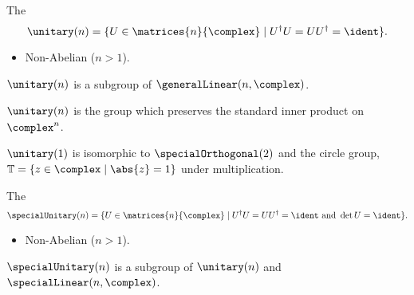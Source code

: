 \begin{dfn}{}{}
    The 
    \begin{equation}
        \unitary(n) = \{ U \in \matrices{n}{\complex} \mid U^\hermit U = UU^\hermit = \ident \}.
    \end{equation}
    
    \begin{multicols}{2}
        \begin{itemize}
            \item Non-Abelian (\(n > 1\)).
        \end{itemize}
    \end{multicols}
    
    \(\unitary(n)\) is a subgroup of \(\generalLinear(n, \complex)\).
    
    \(\unitary(n)\) is the group which preserves the standard inner product on \(\complex^n\).
    
    \(\unitary(1)\) is isomorphic to \(\specialOrthogonal(2)\) and the circle group, \(\mathbb{T} = \{z \in \complex \mid \abs{z} = 1\}\) under multiplication.
\end{dfn}

\begin{dfn}{}{}
    The 
    \begin{equation}
        \specialUnitary(n) = \{ U \in \matrices{n}{\complex} \mid U^\hermit U = UU^\hermit = \ident \text{ and } \det U = \ident \}.
    \end{equation}
    
    \begin{multicols}{2}
        \begin{itemize}
            \item Non-Abelian (\(n > 1\)).
        \end{itemize}
    \end{multicols}

    \(\specialUnitary(n)\) is a subgroup of \(\unitary(n)\) and \(\specialLinear(n, \complex)\).
\end{dfn}

